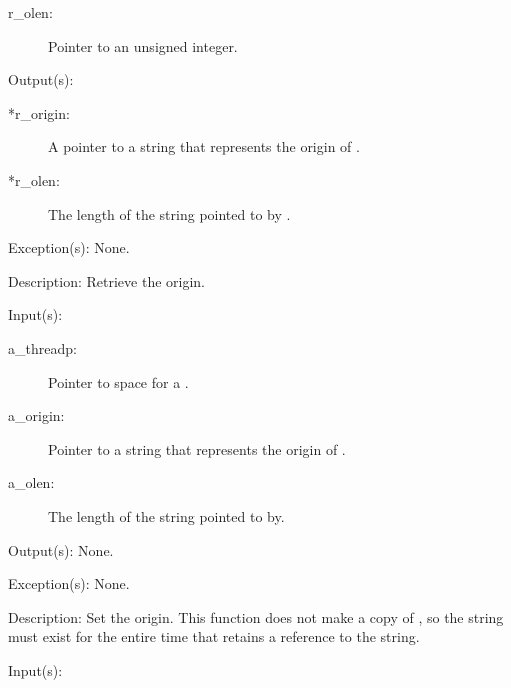 \begin{capi}
\begin{capilist}
\begin{description}
		\item[r\_olen: ] Pointer to an unsigned integer.
		\end{description}
	\item[Output(s): ]
		\begin{description}\item[]
		\item[*r\_origin: ]
			A pointer to a string that represents the origin of
			.
		\item[*r\_olen: ]
			The length of the string pointed to by
			.
		\end{description}
	\item[Exception(s): ] None.
	\item[Description: ]
		Retrieve the origin.
	\end{capilist}
\label{nxo_threadp_origin_set}
	\begin{capilist}
	\item[Input(s): ]
		\begin{description}\item[]
		\item[a\_threadp: ]
			Pointer to space for a .
		\item[a\_origin: ]
			Pointer to a string that represents the origin of
			.
		\item[a\_olen: ]
			The length of the string pointed to by.
		\end{description}
	\item[Output(s): ] None.
	\item[Exception(s): ] None.
	\item[Description: ]
		Set the origin.  This function does not make a copy of
		, so the string must exist for the entire time
		that  retains a reference to the string.
	\end{capilist}
\label{nxo_threadp_position_get}
	\begin{capilist}
	\item[Input(s): ]
		\begin{description}\item[]

\end{description}
\end{capilist}
\end{capi}
